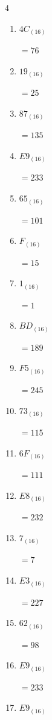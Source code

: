 \begin{multicols}{4}
\begin{enumerate}
  \item $4C_{(16)}$

        $=76$

  \item $19_{(16)}$

        $=25$

  \item $87_{(16)}$

        $=135$

  \item $E9_{(16)}$

        $=233$

  \item $65_{(16)}$

        $=101$

  \item $F_{(16)}$

        $=15$

\columnbreak %

  \item $1_{(16)}$

        $=1$

  \item $BD_{(16)}$

        $=189$

  \item $F5_{(16)}$

        $=245$

  \item $73_{(16)}$

        $=115$

  \item $6F_{(16)}$

        $=111$

  \item $E8_{(16)}$

        $=232$

  \item $7_{(16)}$

        $=7$

  \item $E3_{(16)}$

        $=227$

  \item $62_{(16)}$

        $=98$

  \item $E9_{(16)}$

        $=233$

  \item $E9_{(16)}$


\end{enumerate}
\end{multicols}
